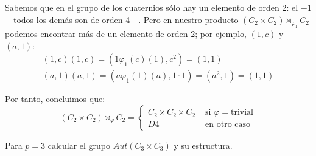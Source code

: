 \documentclass[a4paper, 11pt]{article}
\begin{document}
\begin{solucion}
      Sabemos que en el grupo de los cuaternios sólo hay un elemento de orden 2: el $-1$ ---todos los demás son de orden 4---. Pero en nuestro producto $(C_2 \times C_2) \rtimes_{\varphi_1} C_2$ podemos encontrar más de un elemento de orden 2; por ejemplo, $(1,c)$ y $(a,1)$:
      \begin{align*}
          (1,c)(1,c) = (1\varphi_1(c)(1),c^2) = (1,1) \\
          (a,1)(a,1) = (a\varphi_1(1)(a),1\cdot1) = (a^2,1) = (1,1)
      \end{align*}

      Por tanto, concluimos que:
      \[
      (C_2 \times C_2) \rtimes_{\varphi} C_2 = \begin{cases}
        C_2 \times C_2 \times C_2 &\textrm{ si } \varphi = \textrm{trivial} \\
        D4 &\textrm{ en otro caso}
      \end{cases}
      \]

  \end{solucion}

  \begin{apartado}
      Para $p=3$ calcular el grupo $Aut(C_3 \times C_3)$ y su estructura.
  \end{apartado}
\end{document}
